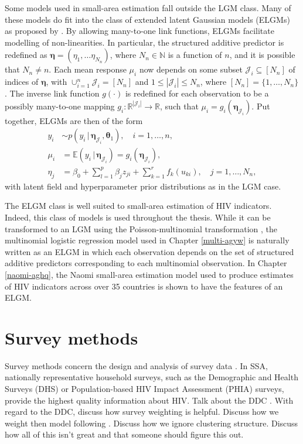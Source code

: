 \documentclass[a4paper, nobind]{templates/ociamthesis}
\newcommand{\btheta}{\bm{\theta}}
\newcommand{\bmeta}{\bm{\eta}}
\begin{document}
Some models used in small-area estimation fall outside the LGM class.
Many of these models do fit into the class of extended latent Gaussian models (ELGMs) as proposed by \textcite{stringer2021fast}.
By allowing many-to-one link functions, ELGMs facilitate modelling of non-linearities.
In particular, the structured additive predictor is redefined as \(\bmeta = (\eta_1, \ldots \eta_{N_n})\), where \(N_n \in \mathbb{N}\) is a function of \(n\), and it is possible that \(N_n \neq n\).
Each mean response \(\mu_i\) now depends on some subset \(\mathcal{J}_i \subseteq [N_n]\) of indices of \(\bmeta\), with \(\cup_{i = 1}^n \mathcal{J}_i = [N_n]\) and \(1 \leq |\mathcal{J}_i| \leq N_n\), where \([N_n] = \{1, \ldots, N_n\}\).
The inverse link function \(g(\cdot)\) is redefined for each observation to be a possibly many-to-one mapping \(g_i: \mathbb{R}^{|\mathcal{J}_i|} \to \mathbb{R}\), such that \(\mu_i = g_i(\bmeta_{\mathcal{J}_i})\).
Put together, ELGMs are then of the form
\begin{align*}
y_i &\sim p(y_i \, | \, \bmeta_{\mathcal{J}_i}, \btheta_1), \quad i = 1, \ldots, n, \\
\mu_i &= \mathbb{E}(y_i \, | \, \bmeta_{\mathcal{J}_i}) = g_i(\bmeta_{\mathcal{J}_i}), \\
\eta_j &= \beta_0 + \sum_{l = 1}^{p} \beta_j z_{ji} + \sum_{k = 1}^{r} f_k(u_{ki}), \quad j = 1, \ldots, N_n,
\end{align*}
with latent field and hyperparameter prior distributions as in the LGM case.

The ELGM class is well suited to small-area estimation of HIV indicators.
Indeed, this class of models is used throughout the thesis.
While it can be transformed to an LGM using the Poisson-multinomial transformation \autocite{baker1994multinomial}, the multinomial logistic regression model used in Chapter \ref{multi-agyw} is naturally written as an ELGM in which each observation depends on the set of structured additive predictors corresponding to each multinomial observation.
In Chapter \ref{naomi-aghq}, the Naomi small-area estimation model used to produce estimates of HIV indicators across over 35 countries is shown to have the features of an ELGM.

\hypertarget{survey-methods}{%
\section{Survey methods}\label{survey-methods}}

Survey methods concern the design and analysis of survey data \autocite{lohr2009sampling}.
In SSA, nationally representative household surveys, such as the Demographic and Health Surveys (DHS) \autocite{dhs} or Population-based HIV Impact Assessment (PHIA) \autocite{phia} surveys, provide the highest quality information about HIV.
Talk about the DDC \autocite{meng2018statistical}.
With regard to the DDC, discuss how survey weighting is helpful.
Discuss how we weight then model following \textcite{chen2014use}.
Discuss how we ignore clustering structure.
Discuss how all of this isn't great and that someone should figure this out.
\end{document}
